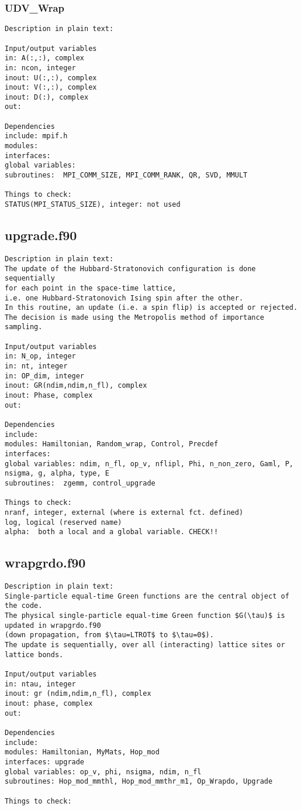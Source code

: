 \subsubsection{UDV\_Wrap}
\begin{verbatim}
Description in plain text:

Input/output variables
in: A(:,:), complex
in: ncon, integer
inout: U(:,:), complex
inout: V(:,:), complex
inout: D(:), complex
out:

Dependencies
include: mpif.h
modules: 
interfaces: 
global variables:  
subroutines:  MPI_COMM_SIZE, MPI_COMM_RANK, QR, SVD, MMULT

Things to check: 
STATUS(MPI_STATUS_SIZE), integer: not used

\end{verbatim}
\clearpage
\subsection{upgrade.f90}
\begin{verbatim}
Description in plain text:
The update of the Hubbard-Stratonovich configuration is done sequentially 
for each point in the space-time lattice,
i.e. one Hubbard-Stratonovich Ising spin after the other. 
In this routine, an update (i.e. a spin flip) is accepted or rejected. 
The decision is made using the Metropolis method of importance sampling.

Input/output variables
in: N_op, integer
in: nt, integer
in: OP_dim, integer
inout: GR(ndim,ndim,n_fl), complex
inout: Phase, complex
out:

Dependencies
include: 
modules: Hamiltonian, Random_wrap, Control, Precdef
interfaces: 
global variables: ndim, n_fl, op_v, nflipl, Phi, n_non_zero, Gaml, P, nsigma, g, alpha, type, E
subroutines:  zgemm, control_upgrade

Things to check: 
nranf, integer, external (where is external fct. defined)
log, logical (reserved name)
alpha:  both a local and a global variable. CHECK!!

\end{verbatim}

\clearpage
\subsection{wrapgrdo.f90}
\begin{verbatim}
Description in plain text:
Single-particle equal-time Green functions are the central object of the code. 
The physical single-particle equal-time Green function $G(\tau)$ is updated in wrapgrdo.f90 
(down propagation, from $\tau=LTROT$ to $\tau=0$). 
The update is sequentially, over all (interacting) lattice sites or lattice bonds.

Input/output variables
in: ntau, integer
inout: gr (ndim,ndim,n_fl), complex
inout: phase, complex
out:

Dependencies
include: 
modules: Hamiltonian, MyMats, Hop_mod
interfaces: upgrade
global variables: op_v, phi, nsigma, ndim, n_fl 
subroutines: Hop_mod_mmthl, Hop_mod_mmthr_m1, Op_Wrapdo, Upgrade

Things to check:
\end{verbatim}

